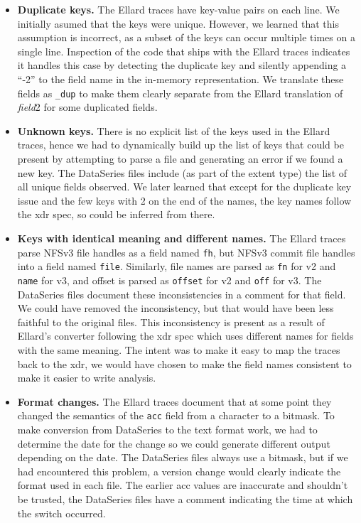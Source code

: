 \begin{itemize}

\item {\bf Duplicate keys.}  The Ellard traces have key-value pairs on
each line.  We initially asumed that the keys were unique.  However,
we learned that this assumption is incorrect, as a subset of the keys
can occur multiple times on a single line.  Inspection of the code
that ships with the Ellard traces indicates it handles this case by
detecting the duplicate key and silently appending a ``-2'' to the
field name in the in-memory representation.  We translate these fields 
as \texttt{\_dup} to make them clearly separate from the Ellard 
translation of {\it field}2 for some duplicated fields.

\item {\bf Unknown keys.} There is no explicit list of the keys used
in the Ellard traces, hence we had to dynamically build up the list of
keys that could be present by attempting to parse a file and
generating an error if we found a new key.  The DataSeries files
include (as part of the extent type) the list of all unique fields
observed.  We later learned that except for the duplicate key issue
and the few keys with 2 on the end of the names, the key names follow
the xdr spec, so could be inferred from there.

\item {\bf Keys with identical meaning and different names.}  The
Ellard traces parse NFSv3 file handles as a field named \texttt{fh},
but NFSv3 commit file handles into a field named \texttt{file}.
Similarly, file names are parsed as \texttt{fn} for v2 and
\texttt{name} for v3, and offset is parsed as \texttt{offset} for v2
and \texttt{off} for v3. The DataSeries files document these
inconsistencies in a comment for that field.  We could have removed
the inconsistency, but that would have been less faithful to the
original files.  This inconsistency is present as a result of Ellard's
converter following the xdr spec which uses different names for fields
with the same meaning.  The intent was to make it easy to map the
traces back to the xdr, we would have chosen to make the field names
consistent to make it easier to write analysis.

\item {\bf Format changes.}  The Ellard traces document that at some
point they changed the semantics of the \texttt{acc} field from a
character to a bitmask.  To make conversion from DataSeries to the
text format work, we had to determine the date for the change so we
could generate different output depending on the date.  The DataSeries
files always use a bitmask, but if we had encountered this problem, a
version change would clearly indicate the format used in each file.
The earlier acc values are inaccurate and shouldn't be trusted, the
DataSeries files have a comment indicating the time at which the
switch occurred.


\end{itemize}
